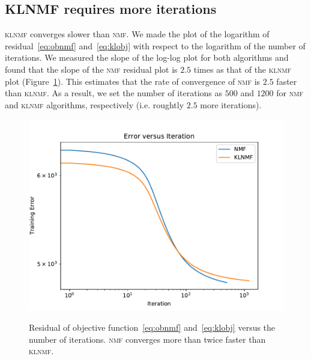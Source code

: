 \subsection{KLNMF requires more iterations}
\textsc{klnmf} converges slower than \textsc{nmf}. We made the plot of the logarithm of residual~\eqref{eq:obnmf} and~\eqref{eq:klobj} with respect to the logarithm of the number of iterations. We measured the slope of the log-log plot for both algorithms and found that the slope of the \textsc{nmf} residual plot is $2.5$ times as that of the \textsc{klnmf} plot (Figure~\ref{error}). This estimates that the rate of convergence of \textsc{nmf} is $2.5$ faster than \textsc{klnmf}. As a result, we set the number of iterations as $500$ and $1200$ for \textsc{nmf} and \textsc{klnmf} algorithms, respectively (i.e. roughtly $2.5$ more iterations).
 \begin{figure}
  \centering
  \includegraphics[scale=.8]{error}\\
  \caption{Residual of objective function~\eqref{eq:obnmf} and~\eqref{eq:klobj} versus the number of iterations. \textsc{nmf} converges more than twice faster than \textsc{klnmf}.}\label{error}
\end{figure}

